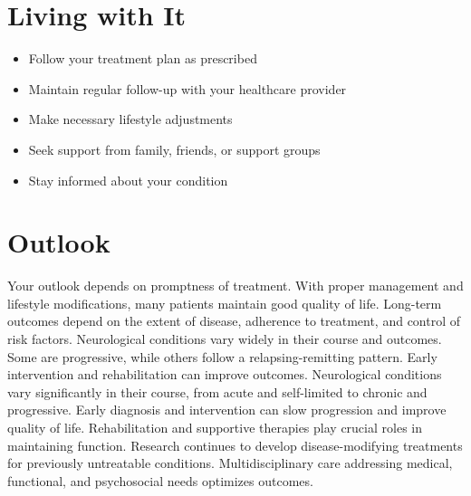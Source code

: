 \section{Living with It}
\begin{itemize}[noitemsep]
  \item Follow your treatment plan as prescribed
  \item Maintain regular follow-up with your healthcare provider
  \item Make necessary lifestyle adjustments
  \item Seek support from family, friends, or support groups
  \item Stay informed about your condition
\end{itemize}
\section{Outlook}
Your outlook depends on promptness of treatment. With proper management and lifestyle modifications, many patients maintain good quality of life. Long-term outcomes depend on the extent of disease, adherence to treatment, and control of risk factors. Neurological conditions vary widely in their course and outcomes. Some are progressive, while others follow a relapsing-remitting pattern. Early intervention and rehabilitation can improve outcomes. Neurological conditions vary significantly in their course, from acute and self-limited to chronic and progressive. Early diagnosis and intervention can slow progression and improve quality of life. Rehabilitation and supportive therapies play crucial roles in maintaining function. Research continues to develop disease-modifying treatments for previously untreatable conditions. Multidisciplinary care addressing medical, functional, and psychosocial needs optimizes outcomes.
